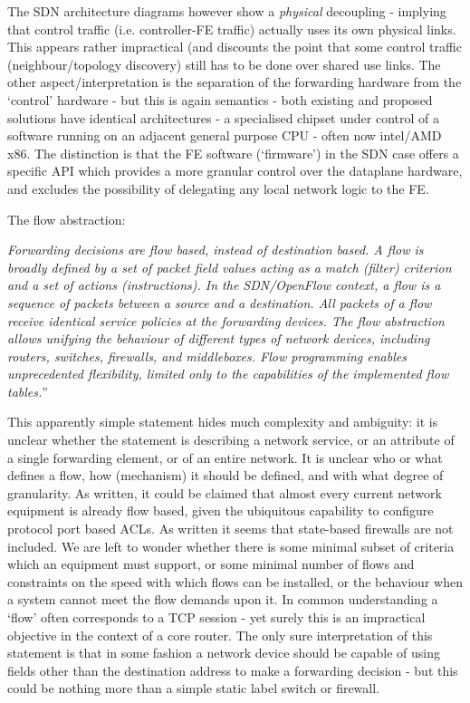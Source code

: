 The SDN architecture diagrams however show a \textit{physical} decoupling - implying that control traffic (i.e. controller-FE traffic) actually uses its own physical links.
This appears rather impractical (and discounts the point that some control traffic (neighbour/topology discovery) still has to be done over shared use links.
The other aspect/interpretation is the separation of the forwarding hardware from the ‘control’ hardware - but this is again semantics - both existing and proposed solutions have identical architectures - a specialised chipset under control of a software running on an adjacent general purpose CPU - often now intel/AMD x86.
The distinction is that the FE software (‘firmware’) in the SDN case offers a specific API which provides a more granular control over the dataplane hardware, and excludes the possibility of delegating any local network logic to the FE.

The flow abstraction:

\textit{Forwarding decisions are flow based, instead of destination based. A flow is broadly defined by a set of packet field values acting as a match (filter) criterion and a set of actions (instructions). In the SDN/OpenFlow context, a flow is a sequence of packets between a source and a destination. All packets of a flow receive identical service policies}
\smallskip
\textit{at the forwarding devices. The flow abstraction allows unifying the behaviour of different types of network devices, including routers, switches, firewalls, and middleboxes. Flow programming enables unprecedented flexibility, limited only to the capabilities of the implemented flow tables.}”


This apparently simple statement hides much complexity and ambiguity: it is unclear whether the statement is describing a network service, or an attribute of a single forwarding element, or of an entire network.
It is unclear who or what defines a flow, how (mechanism) it should be defined, and with what degree of granularity.
As written, it could be claimed that almost every current network equipment is already flow based, given the ubiquitous capability to configure protocol port based ACLs.
As written it seems that state-based firewalls are not included.
We are left to wonder whether there is some minimal subset of criteria which an equipment must support, or some minimal number of flows and constraints on the speed with which flows can be installed, or the behaviour when a system cannot meet the flow demands upon it.
In common understanding a ‘flow’ often corresponds to a TCP session - yet surely this is an impractical objective in the context of a core router.
The only sure interpretation of this statement is that in some fashion a network device should be capable of using fields other than the destination address to make a forwarding decision - but this could be nothing more than a simple static label switch or firewall.

